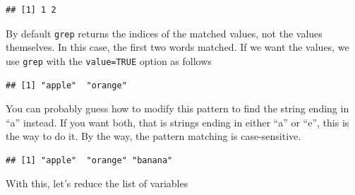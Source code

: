 \documentclass[
  openany]{book}
\newenvironment{Shaded}{\begin{snugshade}}{\end{snugshade}}
\newcommand{\AttributeTok}[1]{\textcolor[rgb]{0.77,0.63,0.00}{#1}}
\newcommand{\ConstantTok}[1]{\textcolor[rgb]{0.00,0.00,0.00}{#1}}
\newcommand{\FunctionTok}[1]{\textcolor[rgb]{0.00,0.00,0.00}{#1}}
\newcommand{\NormalTok}[1]{#1}
\newcommand{\SpecialCharTok}[1]{\textcolor[rgb]{0.00,0.00,0.00}{#1}}
\newcommand{\StringTok}[1]{\textcolor[rgb]{0.31,0.60,0.02}{#1}}
\begin{document}
\begin{verbatim}
## [1] 1 2
\end{verbatim}

By default \texttt{grep} returns the indices of the matched values, not the values themselves. In this case, the first two words matched. If we want the values, we use \texttt{grep} with the \texttt{value=TRUE} option as follows

\begin{Shaded}
\end{Shaded}

\begin{verbatim}
## [1] "apple"  "orange"
\end{verbatim}

You can probably guess how to modify this pattern to find the string ending in ``a'' instead. If you want both, that is strings ending in either ``a'' or ``e'', this is the way to do it. By the way, the pattern matching is case-sensitive.

\begin{Shaded}
\end{Shaded}

\begin{verbatim}
## [1] "apple"  "orange" "banana"
\end{verbatim}

With this, let's reduce the list of variables

\begin{Shaded}
\end{Shaded}
\end{document}

